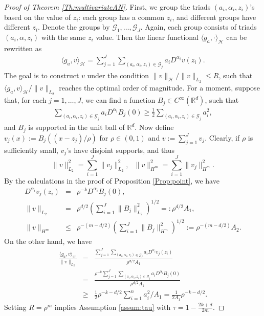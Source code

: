 \documentclass[12pt]{article}
\theoremstyle{plain}
\theoremstyle{remark}
\begin{document}
\begin{proof}[Proof of Theorem \ref{Th:multivariateAN}]
        First, we group the triads $(a_i,\alpha_i,z_i)$'s based on the value of $z_i$: each group has a common $z_i$, and different groups have different $z_i$. Denote the groups by $\mathcal{G}_1,\ldots,\mathcal{G}_J$. Again, each group consists of triads $(a_i,\alpha,z_i)$ with the same $z_i$ value. Then the linear functional $\langle g_a,\cdot\rangle_\mathcal{H}$ can be rewritten as
    \begin{eqnarray}\label{vinner}
        \langle g_a,v\rangle_\mathcal{H}=\sum_{j=1}^J\sum_{(a_i,\alpha_i,z_i)\in\mathcal{G}_j}a_iD^{\alpha_i}v(z_i).
    \end{eqnarray}
    The goal is to construct $v$ under the condition $\|v\|_\mathcal{H}/\|v\|_{L_2}\leq R$, such that $\langle g_a,v\rangle_\mathcal{H}/\|v\|_{L_2}$ reaches the optimal order of magnitude. For a moment, suppose that, for each $j=1,\ldots,J$,  we can find a function $B_j\in C^\infty(\mathbb{R}^d)$, such that
    \begin{eqnarray}\label{Bbound}
        \sum_{(a_i,\alpha_i,z_i)\in\mathcal{G}_j}a_iD^{\alpha_i}B_j(0)\geq \frac{1}{2}\sum_{(a_i,\alpha_i,z_i)\in\mathcal{G}_j}a_i^2,
    \end{eqnarray}
    and $B_j$ is supported in the unit ball of $\mathbb{R}^d$. Now define $v_j(x):=B_j((x-z_j)/\rho)$ for $\rho\in (0,1)$ and $v:=\sum_{j=1}^J v_j$. Clearly, if $\rho$ is sufficiently small, $v_j$'s have disjoint supports, and thus
    \[\|v\|_{L_2}^2=\sum_{i=1}^{J}\|v_j\|_{L_2}^2, ~~~ \|v\|_{H^m}^2=\sum_{i=1}^{J}\|v_j\|_{H^m}^2.\]
    By the calculations in the proof of Proposition \ref{Prop:point}, we have
    \begin{eqnarray*}
        D^{\alpha_i}v_j(z_i)&=&\rho^{-k}D^{\alpha_i}B_j(0),\\
        \|v\|_{L_2}&=&\rho^{d/2}\left(\sum_{i=1}^{J}\|B_j\|_{L_2}^2\right)^{1/2}=:\rho^{d/2} A_1,\\
        \|v\|_{H^m}&\leq&\rho^{-(m-d/2)}\left(\sum_{i=1}^{J}\|B_j\|_{H^m}^2\right)^{1/2}:=\rho^{-(m-d/2)} A_2.
    \end{eqnarray*}
    On the other hand, we have
    \begin{eqnarray*}
        \frac{\langle g_a,v\rangle_\mathcal{H}}{\|v\|_{L_2}}&=&\frac{\sum_{j=1}^J\sum_{(a_i,\alpha_i,z_i)\in\mathcal{G}_j}a_iD^{\alpha_i}v_j(z_i)}{\rho^{d/2} A_1}\\
        &=&\frac{\rho^{-k}\sum_{j=1}^J\sum_{(a_i,\alpha_i,z_i)\in\mathcal{G}_j}a_iD^{\alpha_i}B_j(0)}{\rho^{d/2} A_1}\\
        &\geq&\frac{1}{2}\rho^{-k-d/2}\sum_{i=1}^n a_i^2 /A_1=\frac{1}{2A_1}\rho^{-k-d/2}.
    \end{eqnarray*}
    Setting $R=\rho^m$ implies Assumption \ref{assum:tau} with $\tau=1-\frac{2k+d}{2m}$.


\end{proof}
\end{document}
